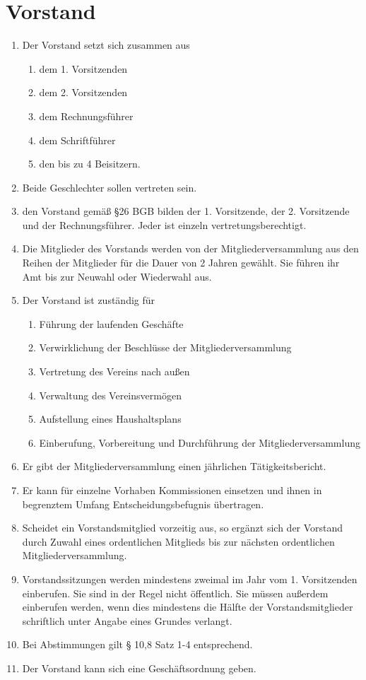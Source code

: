 \documentclass[11pt]{article}
\begin{document}
\section{Vorstand}
\begin{enumerate}[label=\arabic*)]
	\item Der Vorstand setzt sich zusammen aus
	\begin{enumerate}[label=\alph*)]
		\item dem 1. Vorsitzenden
		\item dem 2. Vorsitzenden
		\item dem Rechnungsführer
		\item dem Schriftführer
		\item den bis zu 4 Beisitzern.
	\end{enumerate}
	\item Beide Geschlechter sollen vertreten sein.
	\item den Vorstand gemäß §26 BGB bilden der 1. Vorsitzende, der 2. Vorsitzende und der Rechnungsführer. Jeder ist einzeln vertretungsberechtigt.
	\item Die Mitglieder des Vorstands werden von der Mitgliederversammlung aus den Reihen der Mitglieder für die Dauer von 2 Jahren gewählt. Sie führen ihr Amt bis zur Neuwahl oder Wiederwahl aus.
	\item Der Vorstand ist zuständig für
	\begin{enumerate}[label=\alph*)]
		\item Führung der laufenden Geschäfte
		\item Verwirklichung der Beschlüsse der Mitgliederversammlung
		\item Vertretung des Vereins nach außen
		\item Verwaltung des Vereinsvermögen
		\item Aufstellung eines Haushaltsplans
		\item Einberufung, Vorbereitung und Durchführung der Mitgliederversammlung
	\end{enumerate}	
	\item Er gibt der Mitgliederversammlung einen jährlichen Tätigkeitsbericht.
	\item Er kann für einzelne Vorhaben Kommissionen einsetzen und ihnen in begrenztem Umfang Entscheidungsbefugnis übertragen.
	\item Scheidet ein Vorstandsmitglied vorzeitig aus, so ergänzt sich der Vorstand durch Zuwahl eines ordentlichen Mitglieds bis zur nächsten ordentlichen Mitgliederversammlung. 
	\item Vorstandssitzungen werden mindestens zweimal im Jahr vom 1. Vorsitzenden einberufen. Sie sind in der Regel nicht öffentlich. Sie müssen außerdem einberufen werden, wenn dies mindestens die Hälfte der Vorstandsmitglieder schriftlich unter Angabe eines Grundes verlangt.
	\item Bei Abstimmungen gilt § 10,8 Satz 1-4 entsprechend.
	\item Der Vorstand kann sich eine Geschäftsordnung geben.
\end{enumerate}
\end{document}
